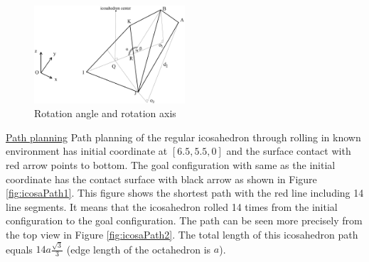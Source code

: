 \begin{figure}[h]
\centering
	\includegraphics[width=0.5\textwidth]{image/icosaGeo55.png}
	\caption{Rotation angle and rotation axis}
	\label{fig:icosaGeo5}
\end{figure}

%
%
\noindent\uline{Path planning} 
Path planning of the regular icosahedron through rolling in known environment has initial coordinate at $[6.5, 5.5, 0]$ and the surface contact with red arrow points to bottom. 
The goal configuration with same as the initial coordinate has the contact surface with black arrow as shown in Figure \ref{fig:icosaPath1}. 
This figure shows the shortest path with the red line including 14 line segments. 
It means that the icosahedron rolled 14 times from the initial configuration to the goal configuration. 
The path can be seen more precisely from the top view in Figure \ref{fig:icosaPath2}.
The total length of this icosahedron path equals $14a\frac{\sqrt{3}}{3}$ (edge length of the octahedron is $a$).

